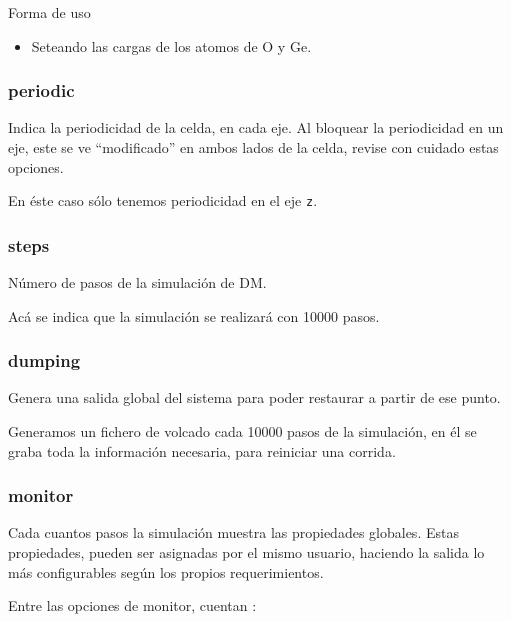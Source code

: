 Forma de uso

\begin{itemize}
 \item Seteando las cargas de los atomos de O y Ge.
\end{itemize}

\subsubsection{periodic}
Indica la periodicidad de la celda, en cada eje. Al bloquear la periodicidad en un eje, este se ve ``modificado'' en ambos lados de la celda, revise con cuidado estas opciones.


En \'este caso s\'olo tenemos periodicidad en el eje \verb|z|.

\subsubsection{steps}
N\'umero de pasos de la simulaci\'on de DM.


Ac\'a se indica que la simulaci\'on se realizar\'a con 10000 pasos.

\subsubsection{dumping}
Genera una salida global del sistema para poder restaurar a partir de ese punto.


Generamos un fichero de volcado cada 10000 pasos de la simulaci\'on, en \'el se graba toda la informaci\'on necesaria, para reiniciar una corrida.

\subsubsection{monitor}
Cada cuantos pasos la simulaci\'on muestra las propiedades globales. Estas propiedades, pueden ser asignadas por el mismo usuario, haciendo la salida lo m\'as configurables seg\'un los propios requerimientos.

Entre las opciones de monitor, cuentan :


